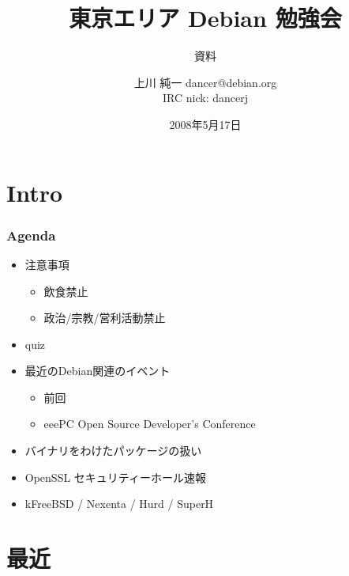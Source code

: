 \documentclass[cjk,dvipdfmx,12pt]{beamer}
\title{東京エリア Debian 勉強会}
\subtitle{資料}
\author{上川 純一 dancer@debian.org\\IRC nick: dancerj}
\date{2008年5月17日}
\begin{document}
\frame{\titlepage{}}


\section{Intro}


\begin{frame}
 \frametitle{Agenda}
\begin{minipage}[t]{0.45\hsize}
  \begin{itemize}
  \item 注意事項
	\begin{itemize}
	 \item 飲食禁止
	 \item 政治/宗教/営利活動禁止
	\end{itemize}
  \item quiz
  \item 最近のDebian関連のイベント
	\begin{itemize}
	 \item 前回 
	 \item eeePC Open Source Developer's Conference 
	\end{itemize}
 \end{itemize}
\end{minipage} 
\begin{minipage}[t]{0.45\hsize}
 \begin{itemize}
  \item バイナリをわけたパッケージの扱い
  \item OpenSSL セキュリティーホール速報
  \item kFreeBSD / Nexenta / Hurd / SuperH
 \end{itemize}
\end{minipage}
\end{frame}

\section{最近}
\end{document}
